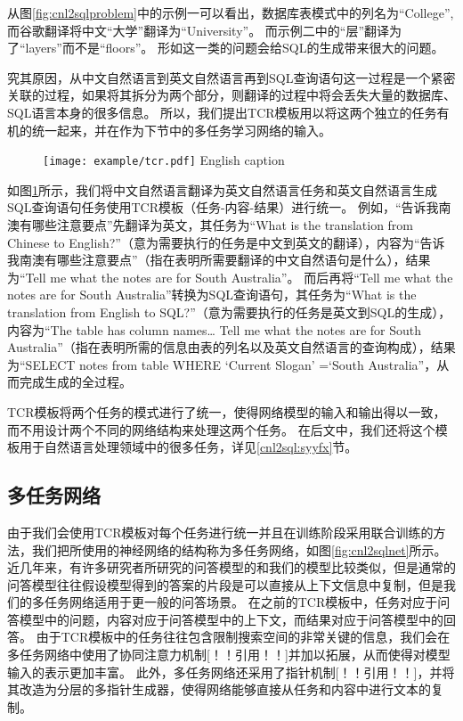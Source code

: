 从图\ref{fig:cnl2sqlproblem}中的示例一可以看出，数据库表模式中的列名为“College”,而谷歌翻译将中文“大学”翻译为“University”。
而示例二中的“层”翻译为了“layers”而不是“floors”。
形如这一类的问题会给SQL的生成带来很大的问题。

究其原因，从中文自然语言到英文自然语言再到SQL查询语句这一过程是一个紧密关联的过程，如果将其拆分为两个部分，则翻译的过程中将会丢失大量的数据库、SQL语言本身的很多信息。
所以，我们提出TCR模板用以将这两个独立的任务有机的统一起来，并在作为下节中的多任务学习网络的输入。

\begin{figure}[!htp]
    \centering
    \texttt{[image: example/tcr.pdf]}
      {English caption}
    \label{fig:cnl2sqltcr}
  \end{figure}

如图\ref{fig:cnl2sqltcr}所示，我们将中文自然语言翻译为英文自然语言任务和英文自然语言生成SQL查询语句任务使用TCR模板（任务-内容-结果）进行统一。
例如，“告诉我南澳有哪些注意要点”先翻译为英文，其任务为“What is the translation from Chinese to English?”（意为需要执行的任务是中文到英文的翻译），内容为“告诉我南澳有哪些注意要点”（指在表明所需要翻译的中文自然语句是什么），结果为“Tell me what the notes are for South Australia”。
而后再将“Tell me what the notes are for South Australia”转换为SQL查询语句，其任务为“What is the translation from English to SQL?”（意为需要执行的任务是英文到SQL的生成），内容为“The table has column names… Tell me what the notes are for South Australia”（指在表明所需的信息由表的列名以及英文自然语言的查询构成），结果为“SELECT notes from table WHERE ‘Current Slogan’ =‘South Australia”，从而完成生成的全过程。

TCR模板将两个任务的模式进行了统一，使得网络模型的输入和输出得以一致，而不用设计两个不同的网络结构来处理这两个任务。
在后文中，我们还将这个模板用于自然语言处理领域中的很多任务，详见\ref{cnl2sql:syyfx}节。

\subsection{多任务网络}

由于我们会使用TCR模板对每个任务进行统一并且在训练阶段采用联合训练的方法，我们把所使用的神经网络的结构称为多任务网络，如图\ref{fig:cnl2sqlnet}所示。
近几年来，有许多研究者所研究的问答模型的和我们的模型比较类似，但是通常的问答模型往往假设模型得到的答案的片段是可以直接从上下文信息中复制，但是我们的多任务网络适用于更一般的问答场景。
在之前的TCR模板中，任务对应于问答模型中的问题，内容对应于问答模型中的上下文，而结果对应于问答模型中的回答。
由于TCR模板中的任务往往包含限制搜索空间的非常关键的信息，我们会在多任务网络中使用了协同注意力机制[！！引用！！]并加以拓展，从而使得对模型输入的表示更加丰富。
此外，多任务网络还采用了指针机制[！！引用！！]，并将其改造为分层的多指针生成器，使得网络能够直接从任务和内容中进行文本的复制。

